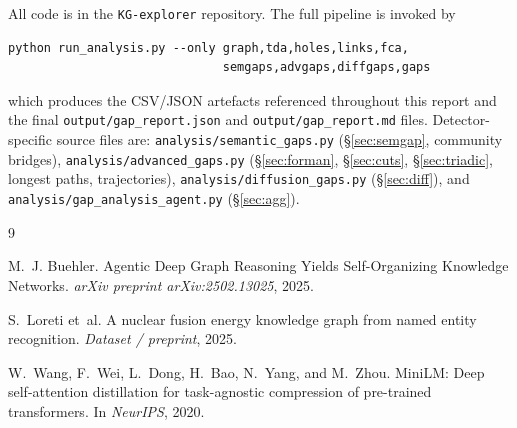 \documentclass[11pt,a4paper]{article}
\newcommand{\code}[1]{\texttt{\small #1}}
\begin{document}
All code is in the \code{KG-explorer} repository. The full pipeline is invoked by
\begin{verbatim}
python run_analysis.py --only graph,tda,holes,links,fca,
                              semgaps,advgaps,diffgaps,gaps
\end{verbatim}
which produces the CSV/JSON artefacts referenced throughout this report and the final \code{output/gap\_report.json} and \code{output/gap\_report.md} files. Detector-specific source files are: \code{analysis/semantic\_gaps.py} (\S\ref{sec:semgap}, community bridges), \code{analysis/advanced\_gaps.py} (\S\ref{sec:forman}, \S\ref{sec:cuts}, \S\ref{sec:triadic}, longest paths, trajectories), \code{analysis/diffusion\_gaps.py} (\S\ref{sec:diff}), and \code{analysis/gap\_analysis\_agent.py} (\S\ref{sec:agg}).


\begin{thebibliography}{9}

M.~J. Buehler.
\newblock Agentic Deep Graph Reasoning Yields Self-Organizing Knowledge Networks.
\newblock \emph{arXiv preprint arXiv:2502.13025}, 2025.

S.~Loreti et~al.
\newblock A nuclear fusion energy knowledge graph from named entity recognition.
\newblock \emph{Dataset / preprint}, 2025.

W.~Wang, F.~Wei, L.~Dong, H.~Bao, N.~Yang, and M.~Zhou.
\newblock MiniLM: Deep self-attention distillation for task-agnostic compression of pre-trained transformers.
\newblock In \emph{NeurIPS}, 2020.

\end{thebibliography}
\end{document}
